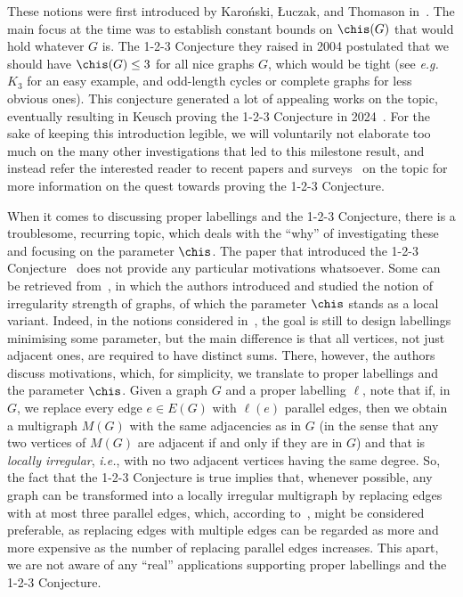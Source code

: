 \documentclass[a4paper,11pt,dvipsnames]{elsarticle}
\begin{document}
These notions were first introduced by Karo\'nski, {\L}uczak, and Thomason in~\cite{KLT04}.
The main focus at the time was to establish constant bounds on $\chis(G)$ that would hold whatever $G$ is.
The 1-2-3 Conjecture they raised in 2004 postulated that we should have $\chis(G) \leq 3$ for all nice graphs $G$,
which would be tight (see \textit{e.g.}~$K_3$ for an easy example, and odd-length cycles or complete graphs for less obvious ones). %
This conjecture generated a lot of appealing works on the topic,
eventually resulting in Keusch proving the 1-2-3 Conjecture in 2024~\cite{Keu24}.
For the sake of keeping this introduction legible, we will voluntarily not elaborate too much on the many other investigations that led to this milestone result,
and instead refer the interested reader to recent papers and surveys~\cite{Gal98,Sea12} on the topic for more information 
on the quest towards proving the 1-2-3 Conjecture.

\medskip

When it comes to discussing proper labellings and the 1-2-3 Conjecture,
there is a troublesome, recurring topic, 
which deals with the ``why'' of investigating these and focusing on the parameter $\chis$.
The paper that introduced the 1-2-3 Conjecture~\cite{KLT04} does not provide any particular motivations whatsoever.
Some can be retrieved from~\cite{CJLORS88}, in which the authors introduced and studied the notion of irregularity strength of graphs,
of which the parameter $\chis$ stands as a local variant.
Indeed, in the notions considered in~\cite{CJLORS88}, the goal is still to design labellings minimising some parameter,
but the main difference is that all vertices, not just adjacent ones, are required to have distinct sums.
There, however, the authors discuss motivations, which, for simplicity,
we translate to proper labellings and the parameter $\chis$.
Given a graph $G$ and a proper labelling $\ell$,
note that if, in $G$, we replace every edge $e \in E(G)$ with $\ell(e)$ parallel edges,
then we obtain a multigraph $M(G)$ with the same adjacencies as in $G$ (in the sense that any two vertices of $M(G)$ are adjacent if and only if they are in $G$)
and that is \textit{locally irregular}, \textit{i.e.}, with no two adjacent vertices having the same degree.
So, the fact that the 1-2-3 Conjecture is true implies that, whenever possible,
any graph can be transformed into a locally irregular multigraph by replacing edges with at most three parallel edges,
which, according to~\cite{CJLORS88}, might be considered preferable, 
as replacing edges with multiple edges can be regarded as more and more expensive as the number of replacing parallel edges increases.
This apart, we are not aware of any ``real'' applications supporting proper labellings and the 1-2-3 Conjecture. %
\end{document}
